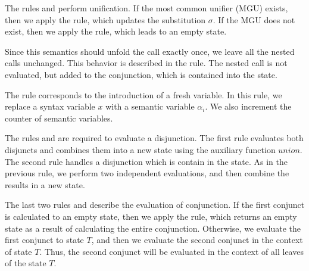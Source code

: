The rules  and  perform unification. If the most common unifier (MGU) exists, then we apply the  rule, which updates the substitution $\sigma$. If the MGU does not exist, then we apply the  rule, which leads to an empty state.

Since this semantics should unfold the call exactly once, we leave all the nested calls unchanged. This behavior is described in the  rule. The nested call is not evaluated, but added to the conjunction, which is contained into the state.

The  rule corresponds to the introduction of a fresh variable. In this rule, we replace a syntax variable $x$ with a semantic variable $\alpha_i$. We also increment the counter of semantic variables.

The rules  and  are required to evaluate a disjunction. The first rule evaluates both disjuncts and combines them into a new state using the auxiliary function $union$. The second rule handles a disjunction which is contain in the state. As in the previous rule, we perform two independent evaluations, and then combine the results in a new state.

The last two rules  and  describe the evaluation of conjunction. If the first conjunct is calculated to an empty state, then we apply the  rule, which returns an empty state as a result of calculating the entire conjunction. Otherwise, we evaluate the first conjunct to state $T$, and then we evaluate the second conjunct in the context of state $T$. Thus, the second conjunct will be evaluated in the context of all leaves of the state $T$.

